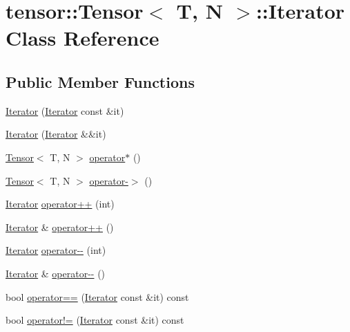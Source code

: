 \hypertarget{classtensor_1_1Tensor_1_1Iterator}{}\section{tensor\+:\+:Tensor$<$ T, N $>$\+:\+:Iterator Class Reference}
\label{classtensor_1_1Tensor_1_1Iterator}
\subsection*{Public Member Functions}
\begin{DoxyCompactItemize}
\item 
\hyperlink{classtensor_1_1Tensor_1_1Iterator_a479a10ccedab15b66eef443122a87c04}{Iterator} (\hyperlink{classtensor_1_1Tensor_1_1Iterator}{Iterator} const \&it)
\item 
\hyperlink{classtensor_1_1Tensor_1_1Iterator_a5a9d9143961e421de88d707e6e71459b}{Iterator} (\hyperlink{classtensor_1_1Tensor_1_1Iterator}{Iterator} \&\&it)
\item 
\hyperlink{classtensor_1_1Tensor}{Tensor}$<$ T, N $>$ \hyperlink{classtensor_1_1Tensor_1_1Iterator_ab7d565be8d0c23cc779348b61dde5a59}{operator$\ast$} ()
\item 
\hyperlink{classtensor_1_1Tensor}{Tensor}$<$ T, N $>$ \hyperlink{classtensor_1_1Tensor_1_1Iterator_a32dfcac4c414e45a29df53461eff3057}{operator-\/$>$} ()
\item 
\hyperlink{classtensor_1_1Tensor_1_1Iterator}{Iterator} \hyperlink{classtensor_1_1Tensor_1_1Iterator_ad9cd5e0539ec414abd5c93bca7309fb9}{operator++} (int)
\item 
\hyperlink{classtensor_1_1Tensor_1_1Iterator}{Iterator} \& \hyperlink{classtensor_1_1Tensor_1_1Iterator_a410d6649a240b5d565d852d6abc33e08}{operator++} ()
\item 
\hyperlink{classtensor_1_1Tensor_1_1Iterator}{Iterator} \hyperlink{classtensor_1_1Tensor_1_1Iterator_ae1a3486e4eeafb9b99446d22c08649d1}{operator-\/-\/} (int)
\item 
\hyperlink{classtensor_1_1Tensor_1_1Iterator}{Iterator} \& \hyperlink{classtensor_1_1Tensor_1_1Iterator_ac2fa94ca1a7f534f75bd6569715b207d}{operator-\/-\/} ()
\item 
bool \hyperlink{classtensor_1_1Tensor_1_1Iterator_adb4377f2d10e25adae6bac65605f8254}{operator==} (\hyperlink{classtensor_1_1Tensor_1_1Iterator}{Iterator} const \&it) const 
\item 
bool \hyperlink{classtensor_1_1Tensor_1_1Iterator_a5e385ec12ffd7c16f6ae06de500f3dc3}{operator!=} (\hyperlink{classtensor_1_1Tensor_1_1Iterator}{Iterator} const \&it) const 
\end{DoxyCompactItemize}

